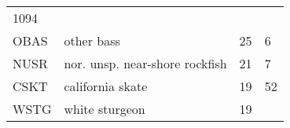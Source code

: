 \documentclass[]{article}
\begin{document}
\begin{longtable}[c]{@{}llll@{}}
\begin{minipage}[t]{0.23\columnwidth}
1094
\end{minipage}
\\\addlinespace
\begin{minipage}[t]{0.08\columnwidth}\raggedright
OBAS
\end{minipage} & \begin{minipage}[t]{0.36\columnwidth}\raggedright
other bass
\end{minipage} & \begin{minipage}[t]{0.21\columnwidth}\raggedright
25
\end{minipage} & \begin{minipage}[t]{0.23\columnwidth}\raggedright
6
\end{minipage}
\\\addlinespace
\begin{minipage}[t]{0.08\columnwidth}\raggedright
NUSR
\end{minipage} & \begin{minipage}[t]{0.36\columnwidth}\raggedright
nor. unsp. near-shore rockfish
\end{minipage} & \begin{minipage}[t]{0.21\columnwidth}\raggedright
21
\end{minipage} & \begin{minipage}[t]{0.23\columnwidth}\raggedright
7
\end{minipage}
\\\addlinespace
\begin{minipage}[t]{0.08\columnwidth}\raggedright
CSKT
\end{minipage} & \begin{minipage}[t]{0.36\columnwidth}\raggedright
california skate
\end{minipage} & \begin{minipage}[t]{0.21\columnwidth}\raggedright
19
\end{minipage} & \begin{minipage}[t]{0.23\columnwidth}\raggedright
52
\end{minipage}
\\\addlinespace
\begin{minipage}[t]{0.08\columnwidth}\raggedright
WSTG
\end{minipage} & \begin{minipage}[t]{0.36\columnwidth}\raggedright
white sturgeon
\end{minipage} & \begin{minipage}[t]{0.21\columnwidth}\raggedright
19
\end{minipage} & \begin{minipage}[t]{0.23\columnwidth}\raggedright

\end{minipage}
\end{longtable}
\end{document}
